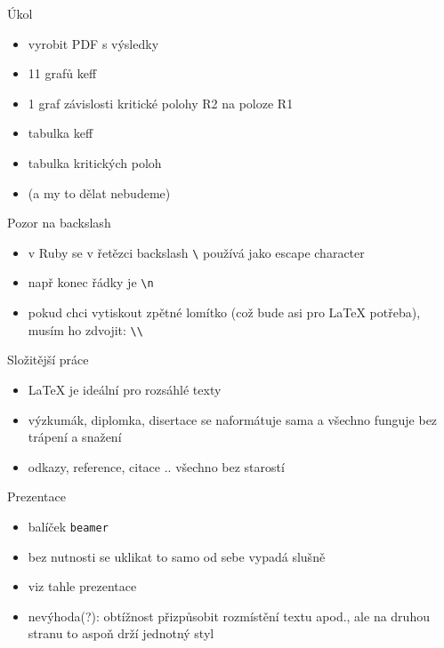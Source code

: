\documentclass{beamer}
\begin{document}
\begin{frame}{Úkol}
  \begin{itemize}
    \item vyrobit PDF s výsledky
    \item 11 grafů keff
    \item 1 graf závislosti kritické polohy R2 na poloze R1
    \item tabulka keff
    \item tabulka kritických poloh
    \item (a my to dělat nebudeme)
  \end{itemize}
\end{frame}

\begin{frame}{Pozor na backslash}
  \begin{itemize}
    \item v Ruby se v řetězci backslash \texttt{\textbackslash} používá jako escape character
    \item např konec řádky je \texttt{\textbackslash n}
    \item pokud chci vytiskout zpětné lomítko (což bude asi pro LaTeX potřeba), musím ho zdvojit: \texttt{\textbackslash \textbackslash}
  \end{itemize}
\end{frame}

\begin{frame}{Složitější práce}
  \begin{itemize}
    \item LaTeX je ideální pro rozsáhlé texty
    \item výzkumák, diplomka, disertace se naformátuje sama a všechno funguje bez trápení a snažení
    \item odkazy, reference, citace .. všechno bez starostí
  \end{itemize}
\end{frame}

\begin{frame}{Prezentace}
  \begin{itemize}
    \item balíček \texttt{beamer}
    \item bez nutnosti se uklikat to samo od sebe vypadá slušně
    \item viz tahle prezentace
    \item nevýhoda(?): obtížnost přizpůsobit rozmístění textu apod., ale na druhou stranu to aspoň drží jednotný styl
  \end{itemize}
\end{frame}
\end{document}
